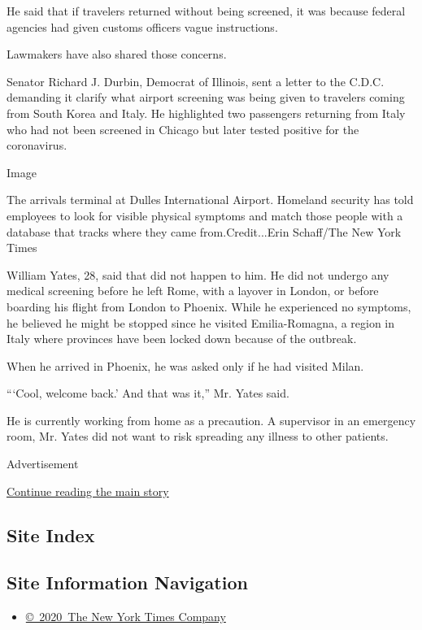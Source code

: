 He said that if travelers returned without being screened, it was
because federal agencies had given customs officers vague instructions.

Lawmakers have also shared those concerns.

Senator Richard J. Durbin, Democrat of Illinois, sent a letter to the
C.D.C. demanding it clarify what airport screening was being given to
travelers coming from South Korea and Italy. He highlighted two
passengers returning from Italy who had not been screened in Chicago but
later tested positive for the coronavirus.

Image

The arrivals terminal at Dulles International Airport. Homeland security
has told employees to look for visible physical symptoms and match those
people with a database that tracks where they came from.Credit...Erin
Schaff/The New York Times

William Yates, 28, said that did not happen to him. He did not undergo
any medical screening before he left Rome, with a layover in London, or
before boarding his flight from London to Phoenix. While he experienced
no symptoms, he believed he might be stopped since he visited
Emilia-Romagna, a region in Italy where provinces have been locked down
because of the outbreak.

When he arrived in Phoenix, he was asked only if he had visited Milan.

```Cool, welcome back.' And that was it,'' Mr. Yates said.

He is currently working from home as a precaution. A supervisor in an
emergency room, Mr. Yates did not want to risk spreading any illness to
other patients.

Advertisement

\protect\hyperlink{after-bottom}{Continue reading the main story}

\hypertarget{site-index}{%
\subsection{Site Index}\label{site-index}}

\hypertarget{site-information-navigation}{%
\subsection{Site Information
Navigation}\label{site-information-navigation}}

\begin{itemize}
\tightlist
\item
  \href{https://help.nytimes3xbfgragh.onion/hc/en-us/articles/115014792127-Copyright-notice}{©~2020~The
  New York Times Company}
\end{itemize}

